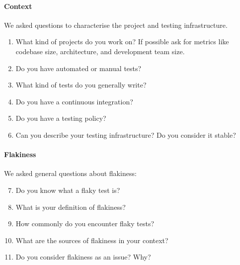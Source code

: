 \paragraph{\textbf{Context}}
We asked questions to characterise the project and testing infrastructure.
\begin{enumerate}[leftmargin=*,noitemsep,topsep=0pt]
    \item What kind of projects do you work on? If possible ask for metrics like codebase size, architecture, and development team size.
    \item Do you have automated or manual tests?
    \item What kind of tests do you generally write?
    \item Do you have a continuous integration?
    \item Do you have a testing policy?
    \item Can you describe your testing infrastructure? Do you consider it stable?
\end{enumerate}

\paragraph{\textbf{Flakiness}}
We asked general questions about flakiness:
\begin{enumerate}[leftmargin=*,noitemsep,topsep=0pt] \setcounter{enumi}{6}
    \item Do you know what a flaky test is? 
    \item What is your definition of flakiness?
    \item How commonly do you encounter flaky tests?
    \item What are the sources of flakiness in your context? 
    \item Do you consider flakiness as an issue? Why?
\end{enumerate}

